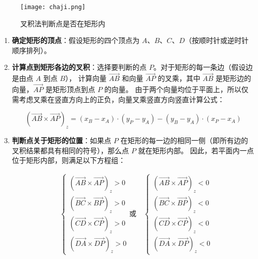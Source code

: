 \documentclass{cumcmthesis1}
\begin{document}
\begin{figure}
    \caption{叉积法判断点是否在矩形内}
    \centering    
    \texttt{[image: chaji.png]}
\end{figure}
\begin{enumerate}
    \item \textbf{确定矩形的顶点}：假设矩形的四个顶点为 $A$、$B$、$C$、$D$（按顺时针或逆时针顺序排列）。
    \item \textbf{计算点到矩形各边的叉积}：选择要判断的点 $P$。对于矩形的每一条边（假设边是由点 $A$ 到点 $B$），
    计算向量 $\overrightarrow{AB}$ 和向量 $\overrightarrow{AP}$ 的叉乘，其中 $\overrightarrow{AB}$ 是矩形边的向量，$\overrightarrow{AP}$ 是矩形顶点到点 $P$ 的向量。
    由于两个向量均位于平面上，所以仅需考虑叉乘在竖直方向上的正负，向量叉乘竖直方向竖直计算公式：

\begin{equation}
(\overrightarrow{AB} \times\overrightarrow{AP})_z=(x_B - x_A) \cdot (y_P - y_A) - (y_B - y_A) \cdot (x_P - x_A)
\end{equation}
    \item  \textbf{判断点关于矩形的位置}：如果点 $P$ 在矩形的每一边的相同一侧（即所有边的叉积结果都具有相同的符号），那么点 $P$ 就在矩形内部。
    因此，若平面内一点位于矩形内部，则满足以下方程组：

    \begin{equation}
        \begin{aligned}
            & \begin{cases}
                (\overrightarrow{AB} \times \overrightarrow{AP})_z > 0 \\
                (\overrightarrow{BC} \times \overrightarrow{BP})_z > 0 \\
                (\overrightarrow{CD} \times \overrightarrow{CP})_z > 0 \\
                (\overrightarrow{DA} \times \overrightarrow{DP})_z > 0
            \end{cases}
            \text{或} \quad
            \begin{cases}
                (\overrightarrow{AB} \times \overrightarrow{AP})_z < 0 \\
                (\overrightarrow{BC} \times \overrightarrow{BP})_z < 0 \\
                (\overrightarrow{CD} \times \overrightarrow{CP})_z < 0 \\
                (\overrightarrow{DA} \times \overrightarrow{DP})_z < 0
            \end{cases}
        \end{aligned}
    \end{equation}
\end{enumerate}    
\end{document}
